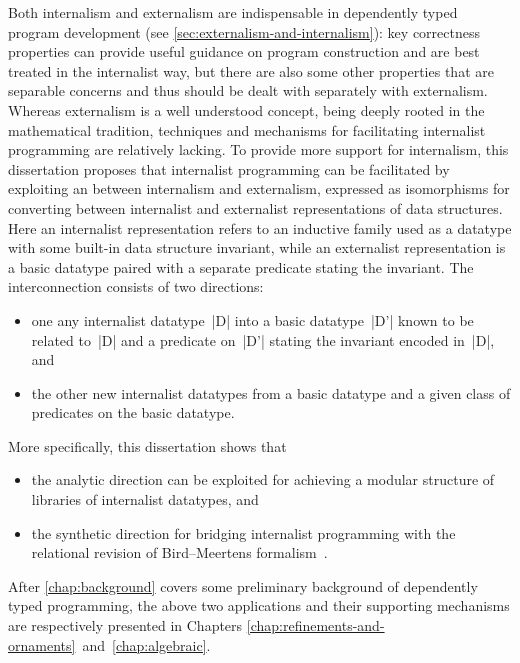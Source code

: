 Both internalism and externalism are indispensable in dependently typed program development (see \autoref{sec:externalism-and-internalism}): key correctness properties can provide useful guidance on program construction and are best treated in the internalist way, but there are also some other properties that are separable concerns and thus should be dealt with separately with externalism.
Whereas externalism is a well understood concept, being deeply rooted in the mathematical tradition, techniques and mechanisms for facilitating internalist programming are relatively lacking.
To provide more support for internalism, this dissertation proposes that internalist programming can be facilitated by exploiting an  between internalism and externalism, expressed as isomorphisms for converting between internalist and externalist representations of data structures.
Here an internalist representation refers to an inductive family used as a datatype with some built-in data structure invariant, while an externalist representation is a basic datatype paired with a separate predicate stating the invariant.
The interconnection consists of two directions:
\begin{itemize}
\item one  any internalist datatype~|D| into a basic datatype~|D'| known to be related to~|D| and a predicate on~|D'| stating the invariant encoded in~|D|, and
\item the other  new internalist datatypes from a basic datatype and a given class of predicates on the basic datatype.
\end{itemize}
More specifically, this dissertation shows that
\begin{itemize}
\item the analytic direction can be exploited for achieving a modular structure of libraries of internalist datatypes, and
\item the synthetic direction for bridging internalist programming with the relational revision of Bird--Meertens formalism~\citep{Bird-AoP}.
\end{itemize}
After \autoref{chap:background} covers some preliminary background of dependently typed programming, the above two applications and their supporting mechanisms are respectively presented in Chapters \ref{chap:refinements-and-ornaments}~and~\ref{chap:algebraic}.
